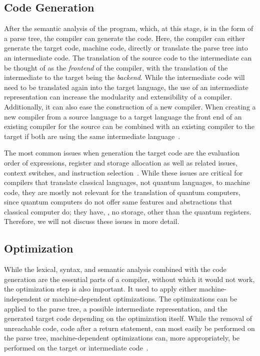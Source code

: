 \subsection{Code Generation}
\label{sec:background_codeGeneration}
After the semantic analysis of the program,
which, at this stage, is in the form of a parse tree, the compiler can generate the code. Here, the compiler can either generate the target code, \eg machine code, directly or translate the parse tree into an intermediate code. 
The translation of the source code to the intermediate can be thought of as the \emph{frontend} of the compiler, with the translation of the intermediate to the target being the \emph{backend}. While the intermediate code will need to be translated again into the target language, the use of an intermediate representation can increase the modularity and extensibility of a compiler. Additionally, it can also ease the construction of a new compiler. When creating a new compiler from a source language to a target language the front end of an existing compiler for the source can be combined with an existing compiler to the target if both are using the same intermediate language~\cite{VSSD07, GFH82}.     

The most common issues when generation the target code are the evaluation order of expressions, register and storage allocation as well as related issues, context switches, and instruction selection~\cite{GFH82}. While these issues are critical for compilers that translate classical languages, \ie not quantum languages, to machine code, they are mostly not relevant for the translation of quantum computers, since quantum computers do not offer same features and abstractions that classical computer do; they have, \eg, no storage, other than the quantum registers.
Therefore, we will not discuss these issues in more detail.

\subsection{Optimization}
\label{sec:background_codeOptimization}
While the lexical, syntax, and semantic analysis combined with the code generation are the essential parts of a compiler, without which it would not work, the optimization step is also important. It used to apply either machine-independent or machine-dependent optimizations. The optimizations can be applied to the parse tree, a possible intermediate representation, and the generated target code depending on the optimization itself. While the removal of unreachable code, \eg code after a return statement, can most easily be performed on the parse tree, machine-dependent optimizations can, more appropriately, be performed on the target or intermediate code~\cite{Oliv07,VSSD07}.

